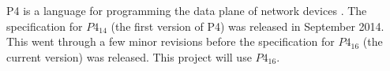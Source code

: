 
P4 is a language for programming the data plane of network devices \cite{P4}. The specification for $P4_{14}$ (the first version of P4) was released in September 2014. This went through a few minor revisions before the specification for $P4_{16}$ (the current version) was released. This project will use $P4_{16}$.
